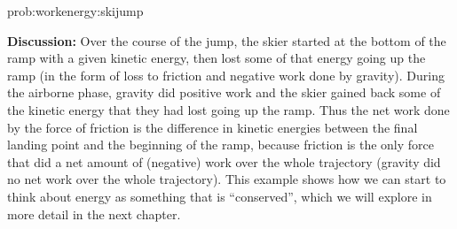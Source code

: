 \begin{solution}{prob:workenergy:skijump}
\begin{enumerate}[label=\alph*)]
\textbf{Discussion:} Over the course of the jump, the skier started at the bottom of the ramp with a given kinetic energy, then lost some of that energy going up the ramp (in the form of loss to friction and negative work done by gravity). During the airborne phase, gravity did positive work and the skier gained back some of the kinetic energy that they had lost going up the ramp. Thus the net work done by the force of friction is the difference in kinetic energies between the final landing point and the beginning of the ramp, because friction is the only force that did a net amount of (negative) work over the whole trajectory (gravity did no net work over the whole trajectory). This example shows how we can start to think about energy as something that is ``conserved'', which we will explore in more detail in the next chapter.

\end{enumerate}
\end{solution}

